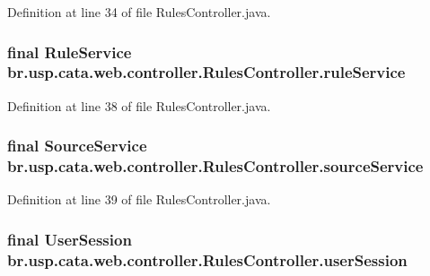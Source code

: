 Definition at line 34 of file Rules\+Controller.\+java.

\hypertarget{classbr_1_1usp_1_1cata_1_1web_1_1controller_1_1_rules_controller_a44a989236fbd708f51daf982a6612e3f}{
\subsubsection[{rule\+Service}]{\setlength{\rightskip}{0pt plus 5cm}final {\bf Rule\+Service} br.\+usp.\+cata.\+web.\+controller.\+Rules\+Controller.\+rule\+Service\hspace{0.3cm}{\ttfamily [private]}}}\label{classbr_1_1usp_1_1cata_1_1web_1_1controller_1_1_rules_controller_a44a989236fbd708f51daf982a6612e3f}


Definition at line 38 of file Rules\+Controller.\+java.

\hypertarget{classbr_1_1usp_1_1cata_1_1web_1_1controller_1_1_rules_controller_a0bdfd02330463311f5f1d872ed2a5825}{
\subsubsection[{source\+Service}]{\setlength{\rightskip}{0pt plus 5cm}final {\bf Source\+Service} br.\+usp.\+cata.\+web.\+controller.\+Rules\+Controller.\+source\+Service\hspace{0.3cm}{\ttfamily [private]}}}\label{classbr_1_1usp_1_1cata_1_1web_1_1controller_1_1_rules_controller_a0bdfd02330463311f5f1d872ed2a5825}


Definition at line 39 of file Rules\+Controller.\+java.

\hypertarget{classbr_1_1usp_1_1cata_1_1web_1_1controller_1_1_rules_controller_aa92287f4621059a80c592dde106e3b3b}{
\subsubsection[{user\+Session}]{\setlength{\rightskip}{0pt plus 5cm}final {\bf User\+Session} br.\+usp.\+cata.\+web.\+controller.\+Rules\+Controller.\+user\+Session\hspace{0.3cm}{\ttfamily [private]}}}\label{classbr_1_1usp_1_1cata_1_1web_1_1controller_1_1_rules_controller_aa92287f4621059a80c592dde106e3b3b}



